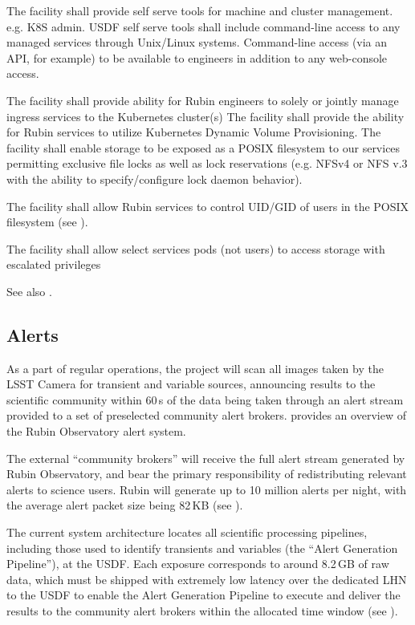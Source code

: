 \reqsimp{}{}{}{}{}{}
{
The facility shall provide self serve tools for machine and cluster management. e.g. K8S admin.
}
\reqsimp{}{}{}{}{}{}
{
USDF self serve tools shall include command-line access to any managed services  through Unix/Linux systems. Command-line access (via an API, for example) to be available to engineers in addition to any web-console access.
}

\reqsimp{}{}{}{}{}{}
{
The facility shall provide ability for Rubin engineers to solely or jointly  manage ingress services to the Kubernetes cluster(s)
}
\reqsimp{}{}{}{}{}{}
{
The facility shall provide the ability for Rubin services to utilize Kubernetes Dynamic Volume Provisioning.
}
\reqsimp{}{}{}{}{}{}
{
 The facility shall enable storage to be  exposed as a POSIX filesystem to our services  permitting exclusive file locks as well as lock reservations (e.g. NFSv4 or NFS v.3 with the ability to specify/configure lock daemon behavior). \label{req:posix}
}

\reqsimp{}{}{}{}{}{}
{
The facility shall allow Rubin services to control UID/GID of users in the POSIX filesystem (see ).
}

\reqsimp{}{}{}{}{}{}
{
The facility shall allow select services pods (not users) to access storage with escalated privileges
}

See also .



\subsection{Alerts}
\label{sec:alerts}

As a part of regular operations, the project will scan all images taken by the
\gls{LSST} Camera for transient and variable sources, announcing results to the
scientific community within 60\,s of the data being taken through an alert stream
provided to a set of preselected community alert brokers.
 provides an overview of the Rubin Observatory alert system.

The external ``community brokers'' will receive the
full alert stream generated by Rubin Observatory, and bear the primary
responsibility of redistributing relevant alerts to science users. Rubin
will generate up to 10 million alerts per night, with the average
alert packet size being 82\,\gls{KB} (see ).

The current system architecture locates all scientific processing
pipelines, including those used to identify transients and variables
(the ``Alert Generation Pipeline''), at the \gls{USDF}.
Each exposure corresponds to around 8.2\,GB of raw data,
which must be shipped with extremely low latency over the dedicated \gls{LHN} to
the \gls{USDF} to enable the Alert Generation Pipeline to execute and
deliver the results to the community alert brokers within the allocated time window (see
).

